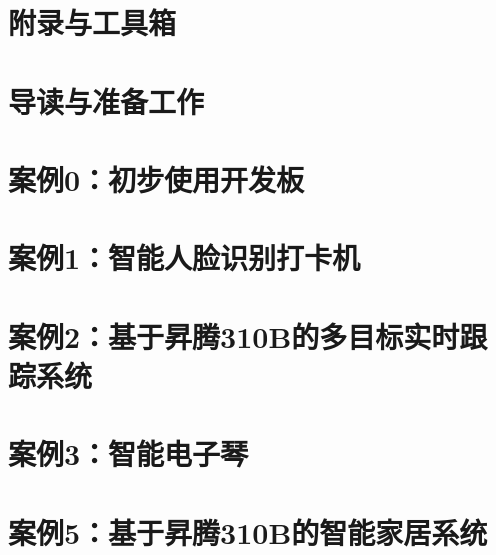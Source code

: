 \documentclass[fontsize=12pt, paper=a4, oneside, DIV=calc]{scrbook}
\theoremstyle{break}
\begin{document}
\chapter{附录与工具箱}


\chapter{导读与准备工作}


\chapter{案例0：初步使用开发板}


\chapter{案例1：智能人脸识别打卡机}


\chapter{案例2：基于昇腾310B的多目标实时跟踪系统}


\chapter{案例3：智能电子琴}




\chapter{案例5：基于昇腾310B的智能家居系统}





\end{document}
